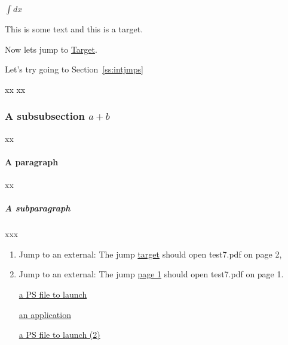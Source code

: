 \begin{slide}





$\int\!dx$
\end{slide}
\begin{slide}

\end{slide}
\begin{slide}
\label{ss:intjmps}

This is some text and this is a \hypertarget{target}{target}.

\end{slide}
\begin{slide}
Now lets jump to \hyperlink{target}{Target}.

Let's try going to Section~\ref{ss:intjmps}

\end{slide}
\begin{slide}
xx
xx
\subsubsection{A subsubsection \texorpdfstring{$a+b$}{a+b}}
xx
\paragraph{A paragraph}
xx
\subparagraph{A subparagraph}
xxx
\end{slide}
\begin{slide}
\label{ss:extjmps}

\begin{enumerate}

\item Jump to an external: The jump
\href{file:test7#TestTarget}{target} should open test7.pdf on
page 2,
\item  Jump to an external: The jump
\href{file:test7#page.1}{page 1} should open test7.pdf on
page 1.


\href{run:picture.eps}{a PS file to launch}

\href{run:fontman.exe}{an application}

\href{run:e:\string\\mdraw\string\\mdraw.exe#picture.eps}{a PS file to launch (2)}
\end{enumerate}
\end{slide}
\begin{slide}
\printindex
\end{slide}




